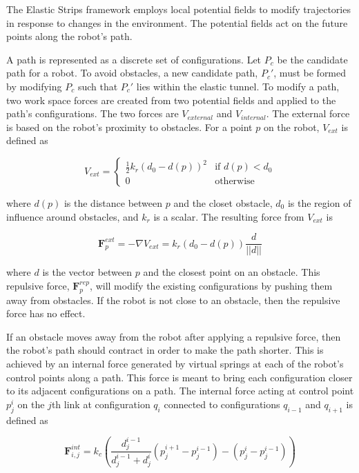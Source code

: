 \documentclass[10pt,conference]{ieeeconf}
\begin{document}
The Elastic Strips framework employs local potential fields to modify trajectories in response to changes in the environment. The potential fields act on the future points along the robot's path.

A path is represented as a discrete set of configurations. Let $P_c$ be the candidate path for a robot. To avoid obstacles, a new candidate path, $P_c'$, must be formed by modifying $P_c$ such that $P_c'$ lies within the elastic tunnel. To modify a path, two work space forces are created from two potential fields and applied to the path's configurations. The two forces are $V_{external}$ and $V_{internal}$. The external force is based on the robot's proximity to obstacles. For a point $p$ on the robot, $V_{ext}$ is defined as

\begin{equation}
V_{ext} = \begin{cases} 
      \frac{1}{2}k_r(d_0 - d(p))^2 & \text{if }  d(p) < d_0 \\
      0 & \text{otherwise}
   \end{cases}
\end{equation}


where $d(p)$ is the distance between $p$ and the closet obstacle, $d_0$ is the region of influence around obstacles, and $k_r$ is a scalar. The resulting force from $V_{ext}$ is

\begin{equation}
\textbf{F}^{ext}_p = -\nabla V_{ext} = k_r(d_0-d(p))\frac{d}{||d||}
\end{equation}

where $d$ is the vector between $p$ and the closest point on an obstacle. This repulsive force, $\textbf{F}^{rep}_p$, will modify the existing configurations by pushing them away from obstacles. If the robot is not close to an obstacle, then the repulsive force has no effect.

If an obstacle moves away from the robot after applying a repulsive force, then the robot's path should contract in order to make the path shorter. This is achieved by an internal force generated by virtual springs at each of the robot's control points along a path. This force is meant to bring each configuration closer to its adjacent configurations on a path. The internal force acting at control point $p^i_j$ on the $j$th link at configuration $q_i$ connected to configurations $q_{i-1}$ and $q_{i+1}$ is defined as

\begin{equation}
\textbf{F}^{int}_{i,j} = k_c\left( \frac{d^{i-1}_j}{d^{i-1}_j+d^i_j} (p^{i+1}_j-p^{i-1}_j)-(p^i_j-p^{i-1}_j) \right)
\end{equation}
\end{document}
